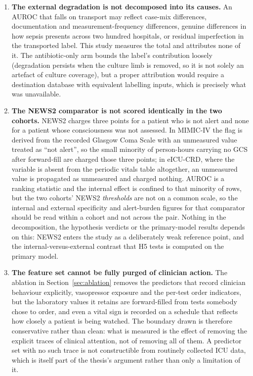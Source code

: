 \begin{enumerate}
    \item \textbf{The external degradation is not decomposed into its causes.}
    An AUROC that falls on transport may reflect case-mix differences,
    documentation and measurement-frequency differences, genuine differences in
    how sepsis presents across two hundred hospitals, or residual imperfection
    in the transported label. This study measures the total and attributes none
    of it. The antibiotic-only arm bounds the label's contribution loosely (degradation persists when the culture limb is removed, so it is not solely
    an artefact of culture coverage), but a proper attribution would require
    a destination database with equivalent labelling inputs, which is precisely
    what was unavailable.

    \item \textbf{The NEWS2 comparator is not scored identically in the two
    cohorts.} NEWS2 charges three points for a patient who is not alert and
    none for a patient whose consciousness was not assessed. In MIMIC-IV the
    flag is derived from the recorded Glasgow Coma Scale with an unmeasured
    value treated as ``not alert'', so the small minority of person-hours
    carrying no GCS after forward-fill are charged those three points; in
    eICU-CRD, where the variable is absent from the periodic vitals table
    altogether, an unmeasured value is propagated as unmeasured and charged
    nothing. AUROC is a ranking statistic and the internal effect is confined
    to that minority of rows, but the two cohorts' NEWS2 \emph{thresholds} are
    not on a common scale, so the internal and external specificity and
    alert-burden figures for that comparator should be read within a cohort and
    not across the pair. Nothing in the decomposition, the hypothesis verdicts
    or the primary-model results depends on this: NEWS2 enters the study as a
    deliberately weak reference point, and the internal-versus-external
    contrast that H5 tests is computed on the primary model.

    \item \textbf{The feature set cannot be fully purged of clinician action.}
    The ablation in Section~\ref{sec:ablation} removes the
    \pcAblNDropped{} predictors that record clinician behaviour explicitly, vasopressor exposure and the per-test order indicators, but the
    laboratory values it retains are forward-filled from tests somebody chose
    to order, and even a vital sign is recorded on a schedule that reflects how
    closely a patient is being watched. The boundary drawn is therefore
    conservative rather than clean: what is measured is the effect of removing
    the explicit traces of clinical attention, not of removing all of them. A
    predictor set with no such trace is not constructible from routinely
    collected ICU data, which is itself part of the thesis's argument rather
    than only a limitation of it.


\end{enumerate}
